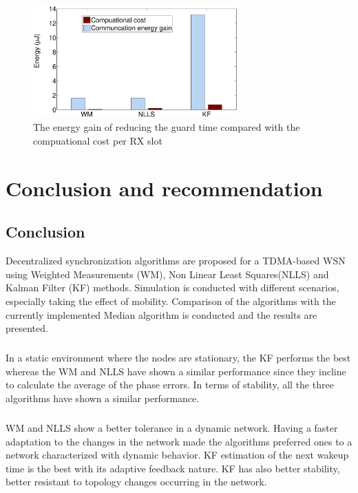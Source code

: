\documentclass[a4paper,10pt]{report}
\begin{document}
\begin{figure}[!h]
\centering
\includegraphics[width=0.7\textwidth]{commvscompute}
\caption{The energy gain of reducing the guard time compared with the compuational cost per RX slot}
\label{guardsave}
\end{figure}
\chapter{\textbf{Conclusion and recommendation}}
\section{\textbf{Conclusion}}
Decentralized synchronization algorithms are proposed for a TDMA-based WSN using Weighted Measurements (WM), Non Linear Least Squares(NLLS) and Kalman Filter (KF) methods. Simulation is conducted with different scenarios, especially taking the effect of mobility. Comparison of the algorithms with the currently implemented Median algorithm is conducted and the results are presented.
\paragraph*{}
In a static environment where the nodes are stationary, the KF performs the best whereas the WM and NLLS have shown a similar performance since they incline to calculate the average of the phase errors. In terms of stability, all the three algorithms have shown a similar performance.
\paragraph*{}
WM and NLLS show a better tolerance in a dynamic network. Having a
faster adaptation to the changes in the network made the algorithms
preferred ones to a network characterized with dynamic behavior. KF
estimation of the next wakeup time is the best with its adaptive feedback nature. KF has also better stability, better
resistant to topology changes occurring in the network.
\end{document}
